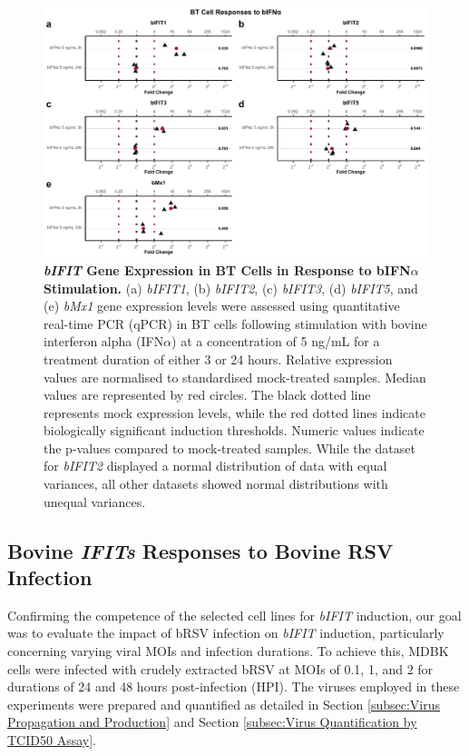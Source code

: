\begin{figure}
    \centering
    \includegraphics[width=1\linewidth]{07. Chapter 2/Figs/02. Induction/08. bt_bifna.pdf}
    \caption[\textit{bIFIT} Gene Expression in BT Cells in Response to bIFN\(\alpha\) Stimulation.]{\textbf{\textit{bIFIT} Gene Expression in BT Cells in Response to bIFN\(\alpha\) Stimulation.} (a) \textit{bIFIT1}, (b) \textit{bIFIT2}, (c) \textit{bIFIT3}, (d) \textit{bIFIT5}, and (e) \textit{bMx1} gene expression levels were assessed using quantitative real-time PCR (qPCR) in BT cells following stimulation with bovine interferon alpha (IFN\(\alpha\)) at a concentration of 5 ng/mL for a treatment duration of either 3 or 24 hours. Relative expression values are normalised to standardised mock-treated samples. Median values are represented by red circles. The black dotted line represents mock expression levels, while the red dotted lines indicate biologically significant induction thresholds. Numeric values indicate the p-values compared to mock-treated samples. While the dataset for \textit{bIFIT2} displayed a normal distribution of data with equal variances, all other datasets showed normal distributions with unequal variances.}
    \label{fig:BT responses to bifna}
\end{figure}

\subsection{Bovine \textit{IFITs} Responses to Bovine RSV Infection} \label{subsec:Bovine IFITs Responses to Bovine RSV Infection}
Confirming the competence of the selected cell lines for \textit{bIFIT} induction, our goal was to evaluate the impact of bRSV infection on \textit{bIFIT} induction, particularly concerning varying viral MOIs and infection durations. To achieve this, MDBK cells were infected with crudely extracted bRSV at MOIs of 0.1, 1, and 2 for durations of 24 and 48 hours post-infection (HPI). The viruses employed in these experiments were prepared and quantified as detailed in Section \ref{subsec:Virus Propagation and Production} and Section \ref{subsec:Virus Quantification by TCID50 Assay}.


